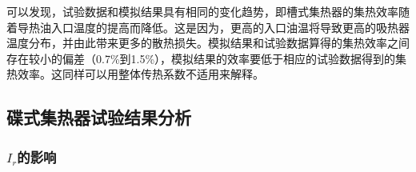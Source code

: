 可以发现，试验数据和模拟结果具有相同的变化趋势，即槽式集热器的集热效率随着导热油入口温度的提高而降低。这是因为，更高的入口油温将导致更高的吸热器温度分布，并由此带来更多的散热损失。模拟结果和试验数据算得的集热效率之间存在较小的偏差（0.7\%到1.5\%），模拟结果的效率要低于相应的试验数据得到的集热效率。这同样可以用整体传热系数不适用来解释。

\subsection{碟式集热器试验结果分析}
\subsubsection{$I_r$的影响}

